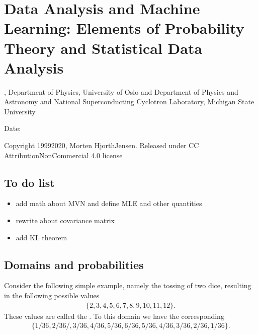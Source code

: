 \documentclass[letterpaper,10pt,english]{sphinxmanual}
\begin{document}
\section{Data Analysis and Machine Learning: Elements of Probability Theory and Statistical Data Analysis}
\label{\detokenize{chapter3:data-analysis-and-machine-learning-elements-of-probability-theory-and-statistical-data-analysis}}\label{\detokenize{chapter3::doc}}




, Department of Physics, University of Oslo and Department of Physics and Astronomy and National Superconducting Cyclotron Laboratory, Michigan State University

Date: 

Copyright 1999\sphinxhyphen{}2020, Morten Hjorth\sphinxhyphen{}Jensen. Released under CC Attribution\sphinxhyphen{}NonCommercial 4.0 license


\subsection{To do list}
\label{\detokenize{chapter3:to-do-list}}\begin{itemize}
\item {} 
add math about MVN and define MLE and other quantities

\item {} 
rewrite about covariance matrix

\item {} 
add KL theorem

\end{itemize}


\subsection{Domains and probabilities}
\label{\detokenize{chapter3:domains-and-probabilities}}
Consider the following simple example, namely the tossing of two dice, resulting in  the following possible values
\begin{equation*}
\begin{split}
\{2,3,4,5,6,7,8,9,10,11,12\}.
\end{split}
\end{equation*}
These values are called the .
To this domain we have the corresponding 
\begin{equation*}
\begin{split}
\{1/36,2/36/,3/36,4/36,5/36,6/36,5/36,4/36,3/36,2/36,1/36\}.
\end{split}
\end{equation*}
\end{document}
